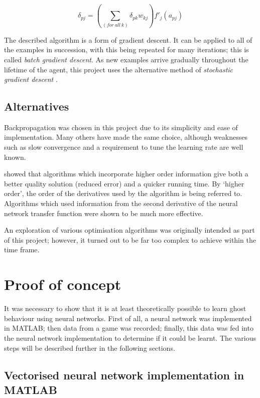 \begin{equation}
\delta_{pj} = \left(\sum_{(for~all~k)}\delta_{pk}w_{kj}\right)f'_{j}(a_{pj})
\label{eq:hiddenerror}
\end{equation}

The described algorithm is a form of gradient descent.  It can be applied to all of the examples in succession, with this being repeated for many iterations; this is called \emph{batch gradient descent}.  As new examples arrive gradually throughout the lifetime of the agent, this project uses the alternative method of \emph{stochastic gradient descent} \citep[p. 720]{RussellNorvig}.

\subsection{Alternatives}

Backpropagation was chosen in this project due to its simplicity and ease of implementation.  Many others have made the same choice, although weaknesses such as slow convergence and a requirement to tune the learning rate are well known.

\citet{Groot1994} showed that algorithms which incorporate higher order information give both a better quality solution (reduced error) and a quicker running time.  By `higher order', the order of the derivatives used by the algorithm is being referred to.  Algorithms which used information from the second derivative of the neural network transfer function were shown to be much more effective.

An exploration of various optimisation algorithms was originally intended as part of this project; however, it turned out to be far too complex to achieve within the time frame.

\section{Proof of concept}

It was necessary to show that it is at least theoretically possible to learn ghost behaviour using neural networks.  First of all, a neural network was implemented in MATLAB; then data from a game was recorded; finally, this data was fed into the neural network implementation to determine if it could be learnt.  The various steps will be described further in the following sections.

\subsection{Vectorised neural network implementation in MATLAB}
\label{sec:matlab}

